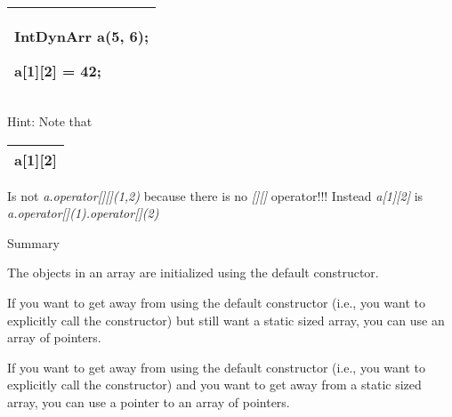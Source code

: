 \documentclass[
]{article}
\begin{document}
\begin{longtable}[]{@{}l@{}}
\toprule
\endhead
\begin{minipage}[t]{0.97\columnwidth}\raggedright
IntDynArr a(5, 6);

a{[}1{]}{[}2{]} = 42;\strut
\end{minipage}\tabularnewline
\bottomrule
\end{longtable}

Hint: Note that

\begin{longtable}[]{@{}l@{}}
\toprule
\endhead
a{[}1{]}{[}2{]}\tabularnewline
\bottomrule
\end{longtable}

Is not \emph{a.operator{[}{]}{[}{]}(1,2)} because there is no
\emph{{[}{]}{[}{]}} operator!!! Instead \emph{a{[}1{]}{[}2{]}} is
\emph{a.operator{[}{]}(1).operator{[}{]}(2)}

Summary

The objects in an array are initialized using the default constructor.

If you want to get away from using the default constructor (i.e., you
want to explicitly call the constructor) but still want a static sized
array, you can use an array of pointers.

If you want to get away from using the default constructor (i.e., you
want to explicitly call the constructor) and you want to get away from a
static sized array, you can use a pointer to an array of pointers.
\end{document}
